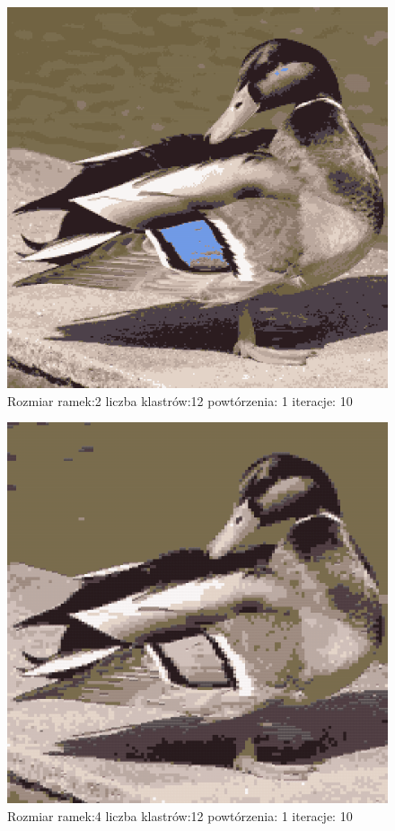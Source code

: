 \documentclass{classrep}
\begin{document}
{{{{                    \begin{figure}[!htbp]
                        \centering
                        \includegraphics[width=\textwidth,width=90mm]{obrazy/duck_R2_K12_P1_It10.png}
                        \caption{Rozmiar ramek:2 liczba klastrów:12 powtórzenia: 1 iteracje: 10 }
                    \end{figure}

                    \begin{figure}[!htbp]
                        \centering
                        \includegraphics[width=\textwidth,width=90mm]{obrazy/duck_R4_K12_P1_It10.png}
                        \caption{Rozmiar ramek:4 liczba klastrów:12 powtórzenia: 1 iteracje: 10 }
                    \end{figure}

}}}}
\end{document}
